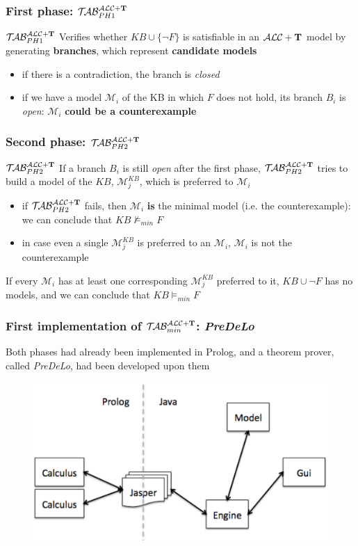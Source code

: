 \documentclass[serif,mathserif]{beamer}
\newcommand{\tip}{{\bf T}}
\newcommand{\alct}{\mathcal{ALC}+\tip}
\newcommand{\nuovoc}{\mathrel{{\mathcal{T}\!\mathcal{AB}}}_{min}^{\mathcal{ALC}+\mbox{\scriptsize $\tip$}}}
\newcommand{\primo}{\mathrel{{\mathcal{T}\!\mathcal{AB}}}_{\scriptsize PH 1}^{\mathcal{ALC}+\mbox{\scriptsize $\tip$}}}
\newcommand{\secondo}{\mathrel{{\mathcal{T}\!\mathcal{AB}}}_{\scriptsize PH 2}^{\mathcal{ALC}+\mbox{\scriptsize $\tip$}}}
\begin{document}
\begin{frame}
	\frametitle{First phase: $\primo$}
	\begin{block}{$\primo$}
	Verifies whether $KB \cup \{\neg F\}$ is satisfiable in an $\alct$ model by generating \textbf{branches}, which represent \textbf{candidate models}
	\begin{itemize}
	\item if there is a contradiction, the branch is \emph{closed}
	\item if we have a model $\mathcal{M}_i$ of the KB in which $F$ does not hold, its branch $B_i$ is \emph{open}: $\mathcal{M}_i$ \textbf{could be a counterexample}
	\end{itemize}
	\end{block}
\end{frame}

\begin{frame}
	\frametitle{Second phase: $\secondo$}
	\begin{block}{$\secondo$}
	If a branch $B_i$ is still \emph{open} after the first phase, $\secondo$ tries to build a model of the $KB$, $\mathcal{M}_j^{KB}$, which is preferred to $\mathcal{M}_i$
	\begin{itemize} 
	\item if $\secondo$ fails, then $\mathcal{M}_i$ \textbf{is} the minimal model (i.e. the counterexample): \alert{we can conclude that $KB \not\models_{min} F$}
	\item in case even a single $\mathcal{M}_j^{KB}$ is preferred to an $\mathcal{M}_i$, $\mathcal{M}_i$ is not the counterexample
	\end{itemize}
	If every $\mathcal{M}_i$ has at least one corresponding $\mathcal{M}_j^{KB}$ preferred to it, $KB \cup \neg F$ has no models, and \alert{we can conclude that $KB \models_{min} F$}
	\end{block}
\end{frame}

\begin{frame}
	\frametitle{First implementation of $\nuovoc$: \emph{PreDeLo}}
	Both phases had already been implemented in Prolog, and a theorem prover, called \emph{PreDeLo}, had been developed upon them

\begin{figure}[htp]
\centering
\includegraphics[scale=.30]{img/predelo.png}
\end{figure}
\end{frame}
\end{document}
